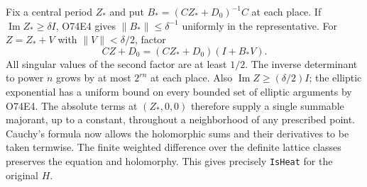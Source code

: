 Fix a central period $Z_*$ and put $B_*=(CZ_*+D_0)^{-1}C$ at each
place. If $\operatorname{Im} Z_*\ge\delta I$, O74E4 gives
$\|B_*\|\le\delta^{-1}$ uniformly in the representative. For
$Z=Z_*+V$ with $\|V\|<\delta/2$, factor
\[
 CZ+D_0=(CZ_*+D_0)(I+B_*V).
\]
All singular values of the second factor are at least $1/2$.
The inverse determinant to power $n$ grows by at most $2^{rn}$
at each place. Also $\operatorname{Im} Z\ge(\delta/2)I$; the
elliptic exponential has a uniform bound on every bounded set of
elliptic arguments by O74E4. The absolute terms at $(Z_*,0,0)$
therefore supply a single summable majorant, up to a constant,
throughout a neighborhood of any prescribed point. Cauchy's formula
now allows the holomorphic sums and their derivatives to be taken
termwise. The finite weighted difference over the definite lattice
classes preserves the equation and holomorphy. This gives precisely
\texttt{IsHeat} for the original $H$.
